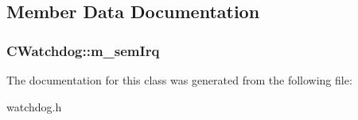 \subsection{Member Data Documentation}
\hypertarget{class_c_watchdog_afac017788a234968c352f037ebb77649}{
\subsubsection[{m\-\_\-sem\-Irq}]{ C\-Watchdog\-::m\-\_\-sem\-Irq}}\label{class_c_watchdog_afac017788a234968c352f037ebb77649}


The documentation for this class was generated from the following file\-:\begin{DoxyCompactItemize}
\item 
watchdog.\-h\end{DoxyCompactItemize}
